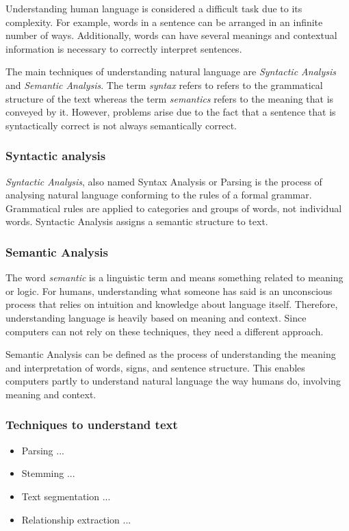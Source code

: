 \documentclass[12pt,a4paper]{article}
\begin{document}
Understanding human language is considered a difficult task due to its complexity. For example, words in a sentence can be arranged in an infinite number of ways. Additionally, words can have several meanings and contextual information is necessary to correctly interpret sentences.

The main techniques of understanding natural language are \textit{Syntactic Analysis} and \textit{Semantic Analysis}. The term \textit{syntax} refers to refers to the grammatical structure of the text whereas the term \textit{semantics} refers to the meaning that is conveyed by it. However, problems arise due to the fact that a sentence that is syntactically correct is not always semantically correct.

\subsubsection{Syntactic analysis}
\textit{Syntactic Analysis}, also named Syntax Analysis or Parsing is the process of analysing natural language conforming to the rules of a formal grammar. Grammatical rules are applied to categories and groups of words, not individual words. Syntactic Analysis assigns a semantic structure to text.

\subsubsection{Semantic Analysis}
The word \textit{semantic} is a linguistic term and means something related to meaning or logic.
For humans, understanding what someone has said is an unconscious process that relies on intuition and knowledge about language itself. Therefore, understanding language is heavily based on meaning and context. Since computers can not rely on these techniques, they need a different approach. 

Semantic Analysis can be defined as the process of understanding the meaning and interpretation of words, signs, and sentence structure. This enables computers partly to understand natural language the way humans do, involving meaning and context.

\subsubsection{Techniques to understand text}
\begin{itemize}
    \item Parsing ...
    \item Stemming ...
    \item Text segmentation ...
    \item Relationship extraction ...
\end{itemize}
\end{document}
